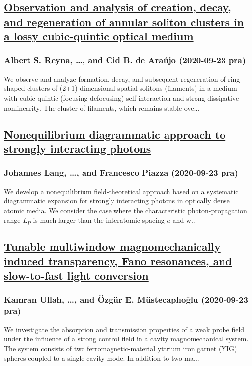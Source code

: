 \subsection*{\href{http://link.aps.org/doi/10.1103/PhysRevA.102.033523}{Observation and analysis of creation, decay, and regeneration of annular soliton clusters in a lossy cubic-quintic optical medium}}
\subsubsection*{Albert S. Reyna, \dots, and Cid B. de Araújo (2020-09-23 pra)}
We observe and analyze formation, decay, and subsequent regeneration of ring-shaped clusters of (2+1)-dimensional spatial solitons (filaments) in a medium with cubic-quintic (focusing-defocusing) self-interaction and strong dissipative nonlinearity. The cluster of filaments, which remains stable ove...
\subsection*{\href{http://link.aps.org/doi/10.1103/PhysRevA.102.033720}{Nonequilibrium diagrammatic approach to strongly interacting photons}}
\subsubsection*{Johannes Lang, \dots, and Francesco Piazza (2020-09-23 pra)}
We develop a nonequilibrium field-theoretical approach based on a systematic diagrammatic expansion for strongly interacting photons in optically dense atomic media. We consider the case where the characteristic photon-propagation range ${L}_{P}$ is much larger than the interatomic spacing $a$ and w...
\subsection*{\href{http://link.aps.org/doi/10.1103/PhysRevA.102.033721}{Tunable multiwindow magnomechanically induced transparency, Fano resonances, and slow-to-fast light conversion}}
\subsubsection*{Kamran Ullah, \dots, and Özgür E. Müstecaplıoğlu (2020-09-23 pra)}
We investigate the absorption and transmission properties of a weak probe field under the influence of a strong control field in a cavity magnomechanical system. The system consists of two ferromagnetic-material yttrium iron garnet (YIG) spheres coupled to a single cavity mode. In addition to two ma...
